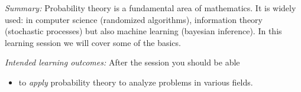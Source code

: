 
\emph{Summary:}
Probability theory is a fundamental area of mathematics.
It is widely used: in computer science (randomized algorithms), information 
theory (stochastic processes) but also machine learning (bayesian inference).
In this learning session we will cover some of the basics.

\emph{Intended learning outcomes:}
After the session you should be able
\begin{itemize}
  \item to \emph{apply} probability theory to analyze problems in various 
    fields.
\end{itemize}

%
%
